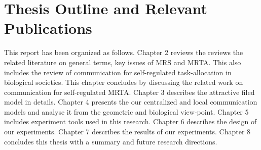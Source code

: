 \section{Thesis Outline and Relevant Publications}
This report has been organized as follows.
Chapter 2  reviews the reviews the related literature on general terms, key issues of MRS and MRTA. This also includes the review of communication  for self-regulated task-allocation in biological societies. This chapter concludes by discussing the related work on communication for self-regulated MRTA.
Chapter 3 describes the attractive filed model in details.
Chapter 4 presents the our centralized and local communication models and analyse it  from the geometric and biological view-point. 
Chapter 5 includes experiment tools used in this research.
Chapter 6 describes the design of our experiments.
Chapter 7 describes the results of our experiments.
Chapter 8 concludes this thesis  with a summary and future research directions.




